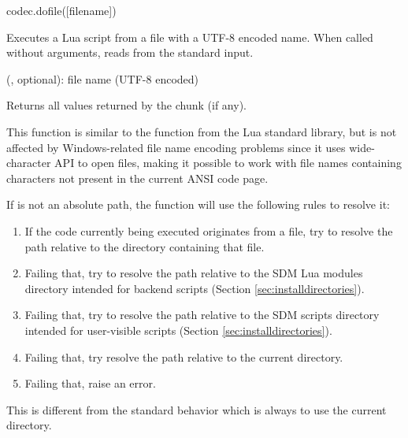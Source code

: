 \documentclass[a4paper,12pt,twoside,extrafontsizes]{memoir}
\begin{document}

\begin{luafuncprototype}
codec.dofile([filename])
\end{luafuncprototype}

\begin{funcdescr}
	Executes a Lua script from a file with a UTF-8 encoded name. When called without arguments, reads from the standard input.
\end{funcdescr}

\begin{funcparams}
	 (, optional): file name (UTF-8 encoded)
\end{funcparams}

\begin{funcret}
	Returns all values returned by the chunk (if any).
\end{funcret}

\begin{funcremarks}
	This function is similar to the  function from the Lua standard library, but is not affected by Windows-related file name encoding problems since it uses wide-character API to open files, making it possible to work with file names containing characters not present in the current ANSI code page.
	
	If  is not an absolute path, the function will use the following rules to resolve it:
	
	\begin{enumerate}
		\item If the code currently being executed originates from a file, try to resolve the path relative to the directory containing that file.
		\item Failing that, try to resolve the path relative to the SDM Lua modules directory intended for backend scripts (Section \ref{sec:installdirectories}).
		\item Failing that, try to resolve the path relative to the SDM scripts directory intended for user-visible scripts (Section \ref{sec:installdirectories}).
		\item Failing that, try resolve the path relative to the current directory.
		\item Failing that, raise an error.
	\end{enumerate}
	
	This is different from the standard  behavior which is always to use the current directory.
\end{funcremarks}
\end{document}
